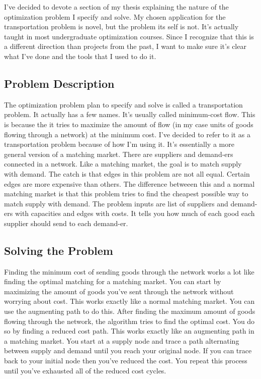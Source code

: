 \documentclass{report}
\begin{document}
I've decided to devote a section of my thesis explaining the nature of the optimization problem I specify and solve. My chosen application for the transportation problem is novel, but the problem its self is not. It's actually taught in most undergraduate optimization courses. Since I recognize that this is a different direction than projects from the past, I want to make sure it's clear what I've done and the tools that I used to do it.

\subsection{Problem Description}

The optimization problem plan to specify and solve is called a transportation problem. It actually has a few names. It's usually called minimum-cost flow. This is because the it tries to maximize the amount of flow (in my case units of goods flowing through a network) at the minimum cost. I've decided to refer to it as a transportation problem because of how I'm using it. It's essentially a more general version of a matching market. There are suppliers and demand-ers connected in a network. Like a matching market, the goal is to match supply with demand. The catch is that edges in this problem are not all equal. Certain edges are more expensive than others. The difference betweeen this and a normal matching market is that this problem tries to find the cheapest possible way to match supply with demand. The problem inputs are list of suppliers and demand-ers with capacities and edges with costs. It tells you how much of each good each supplier should send to each demand-er.

\subsection{Solving the Problem}

Finding the minimum cost of sending goods through the network works a lot like finding the optimal matching for a matching market. You can start by maximizing the amount of goods you've sent through the network without worrying about cost. This works exactly like a normal matching market. You can use the augmenting path to do this. After finding the maximum amount of goods flowing through the network, the algorithm tries to find the optimal cost. You do so by finding a reduced cost path. This works exactly like an augmenting path in a matching market. You start at a supply node and trace a path alternating between supply and demand until you reach your original node. If you can trace back to your initial node then you've reduced the cost. You repeat this process until you've exhausted all of the reduced cost cycles.
\end{document}
